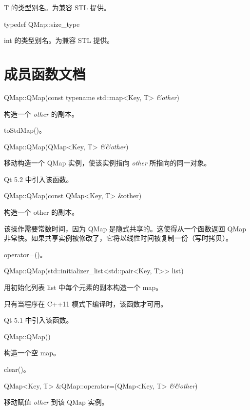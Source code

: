T 的类型别名。为兼容 STL 提供。

\splitLine

typedef QMap::size\_type

int 的类型别名。为兼容 STL 提供。

\section{成员函数文档}

QMap::QMap(const typename std::map<Key, T> \emph{\&other})

构造一个 \emph{other} 的副本。

\begin{seeAlso}
toStdMap()。
\end{seeAlso}

\splitLine

QMap::QMap(QMap<Key, T> \emph{\&\&other})

移动构造一个 QMap 实例，使该实例指向 \emph{other} 所指向的同一对象。

Qt 5.2 中引入该函数。

\splitLine

QMap::QMap(const QMap<Key, T> \&other)

构造一个 other 的副本。

该操作需要常数时间，因为 QMap 是隐式共享的。这使得从一个函数返回 QMap 非常快。如果共享实例被修改了，它将以线性时间被复制一份（写时拷贝）。

\begin{seeAlso}
operator=()。
\end{seeAlso}

\splitLine

QMap::QMap(std::initializer\_list<std::pair<Key, T>> list)

用初始化列表 list 中每个元素的副本构造一个 map。

只有当程序在 C++11 模式下编译时，该函数才可用。

Qt 5.1 中引入该函数。

\splitLine

QMap::QMap()

构造一个空 map。
 
\begin{seeAlso}
clear()。
\end{seeAlso}
	
\splitLine

QMap<Key, T> \&QMap::operator=(QMap<Key, T> \emph{\&\&other})

移动赋值 \emph{other} 到该 QMap 实例。

